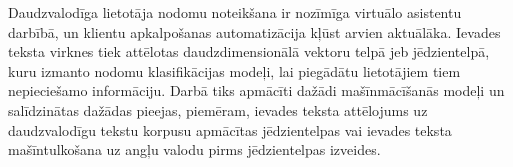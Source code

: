 Daudzvalodīga lietotāja nodomu noteikšana ir nozīmīga virtuālo asistentu darbībā, un klientu apkalpošanas automatizācija kļūst arvien aktuālāka. Ievades teksta virknes tiek attēlotas daudzdimensionālā vektoru telpā jeb jēdzientelpā, kuru izmanto nodomu klasifikācijas modeļi, lai piegādātu lietotājiem tiem nepieciešamo informāciju. Darbā tiks apmācīti dažādi mašīnmācīšanās modeļi un salīdzinātas dažādas pieejas, piemēram, ievades teksta attēlojums uz daudzvalodīgu tekstu korpusu apmācītas jēdzientelpas vai ievades teksta mašīntulkošana uz angļu valodu pirms jēdzientelpas izveides.

